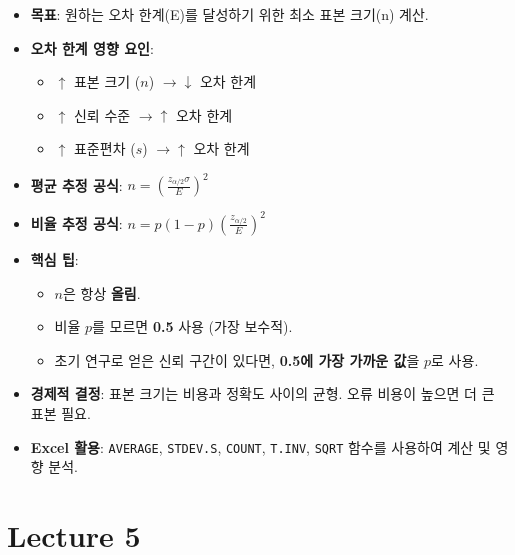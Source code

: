 \documentclass[11pt,a4paper]{book}
\theoremstyle{definition}
\begin{document}
\begin{enumerate}
\begin{enumerate}
\begin{tcolorbox}[colback=boxblue!10!white, colframe=boxblue!75!black, title={\textbf{표본 크기 결정 핵심 요약}}]
\begin{itemize}
    \item \textbf{목표}: 원하는 오차 한계(E)를 달성하기 위한 최소 표본 크기(n) 계산.
    \item \textbf{오차 한계 영향 요인}:
    \begin{itemize}
        \item \(\uparrow\) 표본 크기 (\(n\)) \(\rightarrow \downarrow\) 오차 한계
        \item \(\uparrow\) 신뢰 수준 \(\rightarrow \uparrow\) 오차 한계
        \item \(\uparrow\) 표준편차 (\(s\)) \(\rightarrow \uparrow\) 오차 한계
    \end{itemize}
    \item \textbf{평균 추정 공식}: \(n = \left( \frac{z_{\alpha/2} \sigma}{E} \right)^2\)
    \item \textbf{비율 추정 공식}: \(n = p(1-p) \left( \frac{z_{\alpha/2}}{E} \right)^2\)
    \item \textbf{핵심 팁}:
    \begin{itemize}
        \item \(n\)은 항상 \textbf{올림}.
        \item 비율 \(p\)를 모르면 \textbf{0.5} 사용 (가장 보수적).
        \item 초기 연구로 얻은 신뢰 구간이 있다면, \textbf{0.5에 가장 가까운 값}을 \(p\)로 사용.
    \end{itemize}
    \item \textbf{경제적 결정}: 표본 크기는 비용과 정확도 사이의 균형. 오류 비용이 높으면 더 큰 표본 필요.
    \item \textbf{Excel 활용}: \texttt{AVERAGE}, \texttt{STDEV.S}, \texttt{COUNT}, \texttt{T.INV}, \texttt{SQRT} 함수를 사용하여 계산 및 영향 분석.
\end{itemize}
\end{tcolorbox}


\end{enumerate}  %
\end{enumerate}  %


\chapter{Lecture 5}
\label{ch:module5}
\end{document}
